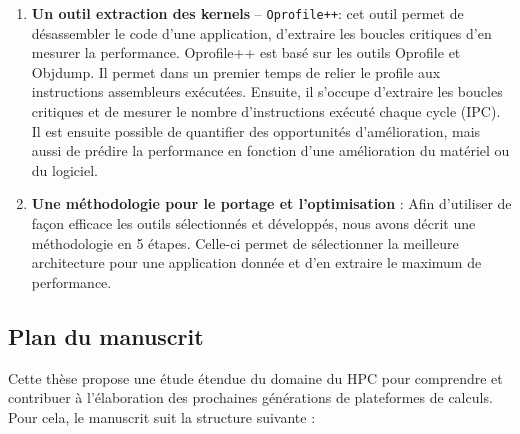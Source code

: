 \begin{enumerate}
            \item \textbf{Un outil extraction des \glspl{kernel}} – \verb=Oprofile++=: cet outil permet de désassembler le code d'une application, d'extraire les boucles critiques d'en mesurer la performance. Oprofile++ est basé sur les outils Oprofile et Objdump. Il permet dans un premier temps de relier le profile aux instructions assembleurs exécutées. Ensuite, il s'occupe d'extraire les boucles critiques et de mesurer le nombre d'instructions exécuté chaque cycle (IPC). Il est ensuite possible de quantifier des opportunités d'amélioration, mais aussi de prédire la performance en fonction d'une amélioration du matériel ou du logiciel.
            
            \item \textbf{Une méthodologie pour le portage et l'optimisation} : Afin d'utiliser de façon efficace les outils sélectionnés et développés, nous avons décrit une méthodologie en 5 étapes. Celle-ci permet de sélectionner la meilleure architecture pour une application donnée et d'en extraire le maximum de performance.
        
        \end{enumerate}
        
    \subsection{Plan du manuscrit}
    
        Cette thèse propose une étude étendue du domaine du HPC pour comprendre et contribuer à l'élaboration des prochaines générations de plateformes de calculs. Pour cela, le manuscrit suit la structure suivante :
        
